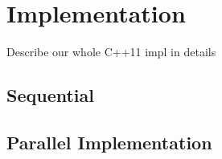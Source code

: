 \section{Implementation}
Describe our whole C++11 impl in details
\subsection{Sequential}
\subsection{Parallel Implementation}
